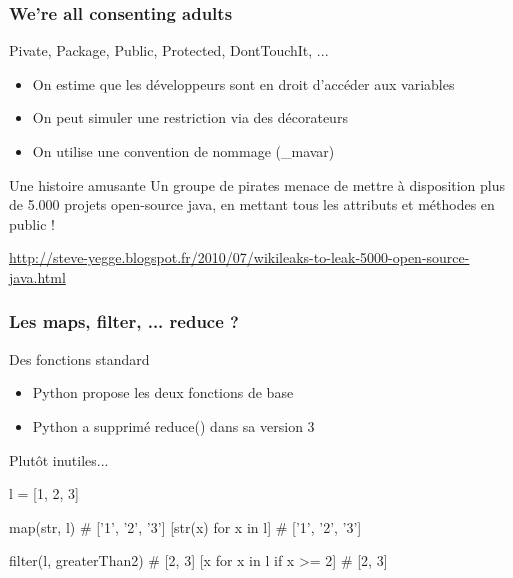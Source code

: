 \documentclass{beamer}
\begin{document}
\begin{frame}
  \frametitle{We're all consenting adults}

  \begin{block}{Pivate, Package, Public, Protected, DontTouchIt, ...}
    \begin{itemize}
    \item On estime que les développeurs sont en droit d'accéder aux
      variables
    \item On peut simuler une restriction via des décorateurs
    \item On utilise une convention de nommage (\_mavar)
    \end{itemize}
  \end{block}

  \pause

  \begin{block}{Une histoire amusante}
  Un groupe de pirates menace de mettre à disposition plus de 5.000
  projets open-source java, en mettant tous les attributs et méthodes
  en public !

  \url{http://steve-yegge.blogspot.fr/2010/07/wikileaks-to-leak-5000-open-source-java.html}
  \end{block}

\end{frame}

\begin{frame}[fragile]
  \frametitle{Les maps, filter, ... reduce ?}

  \begin{block}{Des fonctions standard}
    \begin{itemize}
    \item Python propose les deux fonctions de base
    \item Python a supprimé reduce() dans sa version 3
    \end{itemize}
  \end{block}

  \pause

  \begin{block}{Plutôt inutiles...}
    \begin{python}
l = [1, 2, 3]

map(str, l) # ['1', '2', '3']
[str(x) for x in l] # ['1', '2', '3']

filter(l, greaterThan2) # [2, 3]
[x for x in l if x >= 2] # [2, 3]
    \end{python}
  \end{block}
\end{frame}
\end{document}
